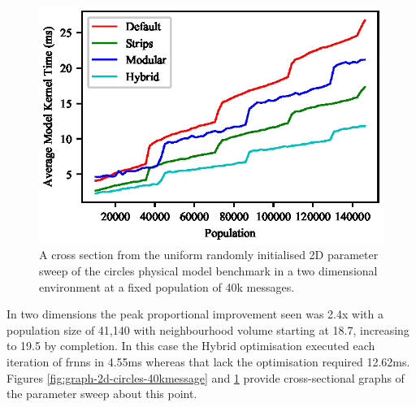 \begin{figure}[!t]
\centering
\includegraphics[width=\linewidth]{../resources/results/2d/circles_18-19_neighbours.eps}
\caption{\label{fig:graph-2d-circles-18-19neighbour}A cross section from the uniform randomly initialised 2D parameter sweep of the circles physical model benchmark in a two dimensional environment at a fixed population of 40k messages.}
\end{figure}
    In two dimensions the peak proportional improvement seen was 2.4x with a population size of 41,140 with neighbourhood volume starting at 18.7, increasing to 19.5 by completion. In this case the Hybrid optimisation executed each iteration of \gls{frnns} in 4.55ms whereas that lack the optimisation required 12.62ms. Figures \ref{fig:graph-2d-circles-40kmessage} and \ref{fig:graph-2d-circles-18-19neighbour} provide cross-sectional graphs of the parameter sweep about this point.
    
